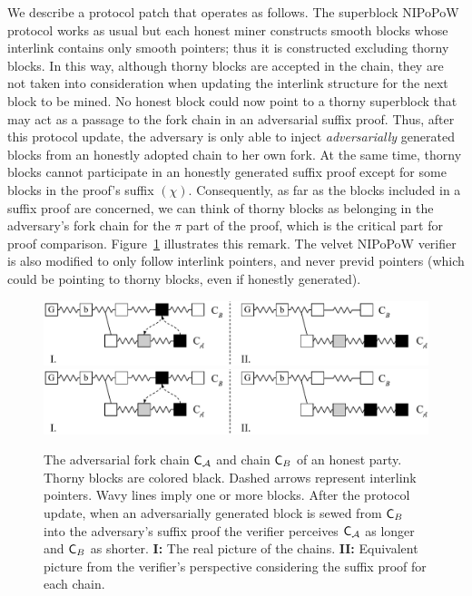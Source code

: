 We describe a protocol patch that operates as follows. The superblock NIPoPoW protocol works as usual but each honest miner constructs smooth blocks whose interlink contains only smooth pointers; thus it is constructed excluding thorny blocks. In this way, although thorny blocks are accepted in the chain, they are not taken into consideration when updating the interlink structure for the next block to be mined. No honest block could now point to a thorny superblock that may act as a passage to the fork chain in an adversarial suffix proof. Thus, after this protocol update, the adversary is only able to inject \emph{adversarially} generated blocks from an honestly adopted chain to her own fork.
At the same time, thorny blocks cannot participate in an honestly generated suffix proof except for some blocks in the proof's suffix $(\chi)$. Consequently, as far as the blocks included in a suffix proof are concerned, we can think of thorny blocks as belonging in the adversary's fork chain for the $\pi$ part of the proof,  which is the critical part for proof comparison.
Figure~\ref{fig:injection} illustrates this remark. The velvet NIPoPoW verifier is also modified to only follow interlink pointers, and never previd pointers (which could be pointing to thorny blocks, even if honestly generated).

\begin{figure}[h!]
	\begin{center}
		\iftwocolumn
			\includegraphics[width=0.7 \textwidth]{figures/injection.pdf}
		\else
			\includegraphics[width=0.8 \textwidth]{figures/injection.pdf}
		\fi
	\end{center}
	\caption{The adversarial fork chain $\mathsf{C}_\mathcal{A}$ and chain $\mathsf{C}_B$ of an honest party. Thorny blocks are colored black. Dashed arrows represent interlink pointers. Wavy lines imply one or more blocks. After the protocol update, when an adversarially generated block is sewed from $\mathsf{C}_B$ into the adversary's suffix proof the verifier perceives $\mathsf{C}_\mathcal{A}$ as longer and $\mathsf{C}_B$ as shorter. \textbf{I:} The real picture of the chains. \textbf{II:} Equivalent picture from the verifier's perspective considering the suffix proof for each chain.}
	\label{fig:injection}
\end{figure}

